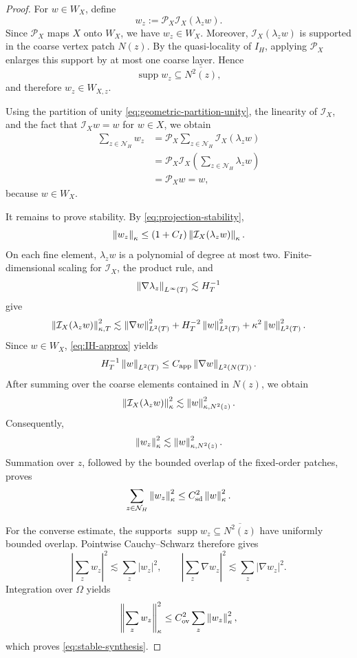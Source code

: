 \begin{proof}
For $w\in W_X$, define
\begin{equation}
\label{eq:wz-construction}
  w_z
  :=
  \mathcal P_X\mathcal I_X(\lambda_z w).
\end{equation}
Since $\mathcal P_X$ maps $X$ onto $W_X$, we have $w_z\in W_X$.
Moreover, $\mathcal I_X(\lambda_z w)$ is supported in the coarse vertex
patch $N(z)$. By the quasi-locality of $I_H$, applying $\mathcal P_X$
enlarges this support by at most one coarse layer. Hence
\[
  \operatorname{supp}w_z
  \subseteq
  \overline{N^2(z)},
\]
and therefore $w_z\in W_{X,z}$.

Using the partition of unity
\eqref{eq:geometric-partition-unity}, the linearity of $\mathcal I_X$,
and the fact that $\mathcal I_Xw=w$ for $w\in X$, we obtain
\[
\begin{aligned}
  \sum_{z\in\mathcal N_H}w_z
  &=
  \mathcal P_X
  \sum_{z\in\mathcal N_H}
  \mathcal I_X(\lambda_z w)
\\
  &=
  \mathcal P_X
  \mathcal I_X
  \left(
    \sum_{z\in\mathcal N_H}\lambda_z w
  \right)
\\
  &=
  \mathcal P_Xw
  =
  w,
\end{aligned}
\]
because $w\in W_X$.

It remains to prove stability. By
\eqref{eq:projection-stability},
\[
  \left\lVert w_z\right\rVert_\kappa
  \leq
  (1+C_I)
  \left\lVert \mathcal I_X(\lambda_z w)\right\rVert_\kappa.
\]
On each fine element, $\lambda_z w$ is a polynomial of degree at most
two. Finite-dimensional scaling for $\mathcal I_X$, the product rule,
and
\[
  \left\lVert \nabla\lambda_z\right\rVert_{L^\infty(T)}
  \lesssim
  H_T^{-1}
\]
give
\[
  \left\lVert \mathcal I_X(\lambda_z w)\right\rVert_{\kappa,T}^2
  \lesssim
  \left\lVert \nabla w\right\rVert_{L^2(T)}^2
  +
  H_T^{-2}\left\lVert w\right\rVert_{L^2(T)}^2
  +
  \kappa^2\left\lVert w\right\rVert_{L^2(T)}^2.
\]
Since $w\in W_X$, \eqref{eq:IH-approx} yields
\[
  H_T^{-1}\left\lVert w\right\rVert_{L^2(T)}
  \leq
  C_{\rm app}
  \left\lVert \nabla w\right\rVert_{L^2(N(T))}.
\]
After summing over the coarse elements contained in $N(z)$, we obtain
\[
  \left\lVert \mathcal I_X(\lambda_z w)\right\rVert_\kappa^2
  \lesssim
  \left\lVert w\right\rVert_{\kappa,N^2(z)}^2.
\]
Consequently,
\[
  \left\lVert w_z\right\rVert_\kappa^2
  \lesssim
  \left\lVert w\right\rVert_{\kappa,N^2(z)}^2.
\]
Summation over $z$, followed by the bounded overlap of the fixed-order
patches, proves
\[
  \sum_{z\in\mathcal N_H}\left\lVert w_z\right\rVert_\kappa^2
  \leq
  C_{\rm sd}^2\left\lVert w\right\rVert_\kappa^2.
\]

For the converse estimate, the supports
$\operatorname{supp}w_z\subseteq\overline{N^2(z)}$ have uniformly
bounded overlap. Pointwise Cauchy--Schwarz therefore gives
\[
  \left|\sum_z w_z\right|^2
  \lesssim
  \sum_z|w_z|^2,
  \qquad
  \left|\sum_z\nabla w_z\right|^2
  \lesssim
  \sum_z|\nabla w_z|^2.
\]
Integration over $\Omega$ yields
\[
  \left\lVert \sum_z w_z\right\rVert_\kappa^2
  \leq
  C_{\rm ov}^2
  \sum_z\left\lVert w_z\right\rVert_\kappa^2,
\]
which proves \eqref{eq:stable-synthesis}.
\end{proof}

